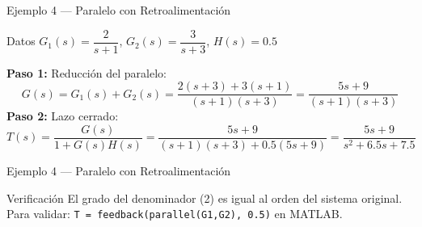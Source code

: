 \documentclass[aspectratio=169,xcolor=dvipsnames]{beamer}
\begin{document}
\begin{frame}{Ejemplo 4 --- Paralelo con Retroalimentaci\'on}
    \begin{exampleblock}{Datos}
        $G_1(s) = \dfrac{2}{s+1}$, \quad $G_2(s) = \dfrac{3}{s+3}$, \quad $H(s) = 0.5$
    \end{exampleblock}
    \vspace{0.2em}
    \textbf{Paso 1:} Reducci\'on del paralelo:
    \begin{equation}
        G(s) = G_1(s) + G_2(s) = \frac{2(s+3)+3(s+1)}{(s+1)(s+3)} = \frac{5s+9}{(s+1)(s+3)}
    \end{equation}
    \textbf{Paso 2:} Lazo cerrado:
    \begin{equation}
        T(s) = \frac{G(s)}{1+G(s)H(s)} = \frac{5s+9}{(s+1)(s+3)+0.5(5s+9)} = \frac{5s+9}{s^2+6.5s+7.5}
    \end{equation}
\end{frame}
\begin{frame}{Ejemplo 4 --- Paralelo con Retroalimentaci\'on}
    \begin{block}{Verificaci\'on}
        El grado del denominador (2) es igual al orden del sistema original. \checkmark\\
        Para validar: \texttt{T = feedback(parallel(G1,G2), 0.5)} en MATLAB.
    \end{block}
\end{frame}
\end{document}
